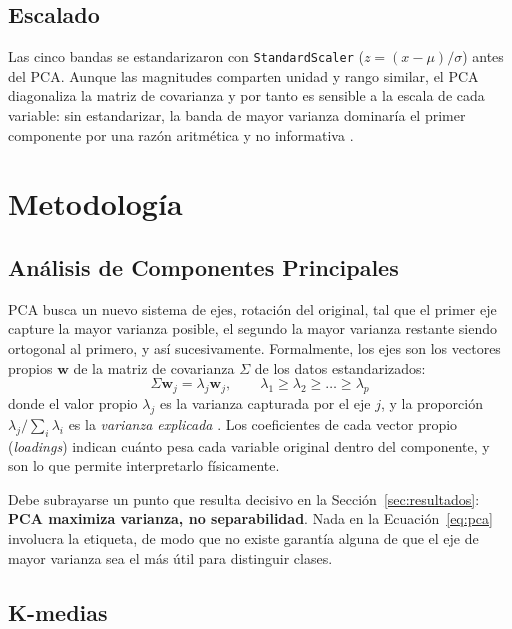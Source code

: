 \documentclass[10pt,journal]{IEEEtran}
\begin{document}
  \subsection{Escalado}

  Las cinco bandas se estandarizaron con \texttt{StandardScaler} ($z=(x-\mu)/\sigma$) antes del PCA. Aunque las magnitudes comparten unidad y rango similar, el PCA diagonaliza la matriz de covarianza y por tanto es sensible a la escala de cada variable: sin estandarizar, la banda de mayor varianza dominar\'ia el primer componente por una raz\'on aritm\'etica y no informativa \cite{jolliffe2016}.

  \section{Metodolog\'ia}

  \subsection{An\'alisis de Componentes Principales}

  PCA busca un nuevo sistema de ejes, rotaci\'on del original, tal que el primer eje capture la mayor varianza posible, el segundo la mayor varianza restante siendo ortogonal al primero, y as\'i sucesivamente. Formalmente, los ejes son los vectores propios $\mathbf{w}$ de la matriz de covarianza $\Sigma$ de los datos estandarizados:
  \begin{equation}
    \Sigma \mathbf{w}_j = \lambda_j \mathbf{w}_j, \qquad \lambda_1 \geq \lambda_2 \geq \dots \geq \lambda_p
    \label{eq:pca}
  \end{equation}
  donde el valor propio $\lambda_j$ es la varianza capturada por el eje $j$, y la proporci\'on $\lambda_j / \sum_i \lambda_i$ es la \emph{varianza explicada} \cite{hotelling1933,jolliffe2016}. Los coeficientes de cada vector propio (\emph{loadings}) indican cu\'anto pesa cada variable original dentro del componente, y son lo que permite interpretarlo f\'isicamente.

  Debe subrayarse un punto que resulta decisivo en la Secci\'on~\ref{sec:resultados}: \textbf{PCA maximiza varianza, no separabilidad}. Nada en la Ecuaci\'on~\ref{eq:pca} involucra la etiqueta, de modo que no existe garant\'ia alguna de que el eje de mayor varianza sea el m\'as \'util para distinguir clases.

  \subsection{K-medias}
\end{document}
